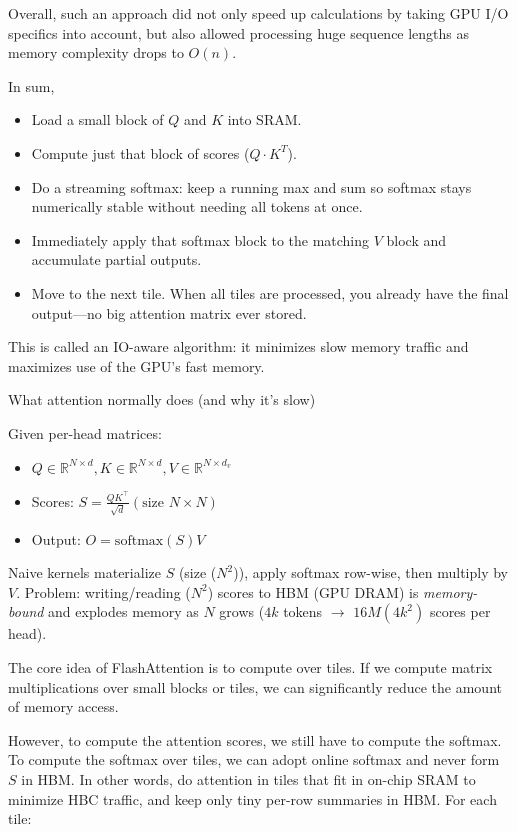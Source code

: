 Overall, such an approach did not only speed up calculations by taking GPU I/O specifics into account, but also allowed processing huge sequence lengths as memory complexity drops to $O(n)$.

In sum,
\begin{itemize}
	\item Load a small block of $Q$ and $K$ into SRAM.
	\item Compute just that block of scores ($Q\cdot K^T$).
	\item Do a streaming softmax: keep a running max and sum so softmax stays numerically stable without needing all tokens at once.
	\item Immediately apply that softmax block to the matching $V$ block and accumulate partial outputs.
	\item Move to the next tile. When all tiles are processed, you already have the final output—no big attention matrix ever stored.
\end{itemize}
This is called an IO-aware algorithm: it minimizes slow memory traffic and maximizes use of the GPU's fast memory.

What attention normally does (and why it's slow)

Given per-head matrices:
\begin{itemize}
	\item$Q \in \mathbb{R}^{N\times d}, K \in \mathbb{R}^{N\times d}, V \in \mathbb{R}^{N\times d_v}$ 
	\item Scores: $S = \frac{QK^\top}{\sqrt{d}}  (\text{size } N\times N)$
	\item Output: $O = \mathrm{softmax}(S)V$
\end{itemize}
Naive kernels materialize $S$ (size ($N^2$)), apply softmax row-wise, then multiply by $V$.
Problem: writing/reading ($N^2$) scores to HBM (GPU DRAM) is \textit{memory-bound} and explodes memory as $N$ grows (\eg $4k$ tokens $\to$ $16M (4k^2)$ scores per head).

The core idea of FlashAttention is to compute over tiles. If we compute matrix multiplications over small blocks or tiles, we can significantly reduce the amount of memory access.

However, to compute the attention scores, we still have to compute the softmax. To compute the softmax over tiles, we can adopt online softmax and never form $S$ in HBM. In other words, do attention in tiles that fit in on-chip SRAM to minimize HBC traffic, and keep only tiny per-row summaries in HBM. For each tile:

